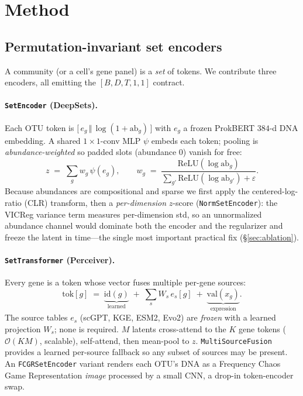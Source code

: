 \documentclass[10pt,twocolumn]{article}
\begin{document}
\section{Method}
\label{sec:method}

\subsection{Permutation-invariant set encoders}
A community (or a cell's gene panel) is a \emph{set} of tokens. We contribute three encoders, all
emitting the $[B,D,T,1,1]$ contract.

\paragraph{\texttt{SetEncoder} (DeepSets).}
Each OTU token is $\big[\,e_g \,\Vert\, \log(1\!+\!\text{ab}_g)\,\big]$ with $e_g$ a frozen ProkBERT
$384$-d DNA embedding. A shared $1\!\times\!1$-conv MLP $\psi$ embeds each token; pooling is
\emph{abundance-weighted} so padded slots (abundance $0$) vanish for free:
\begin{equation}
z \;=\; \sum_{g} w_g\,\psi(e_g),\qquad
w_g \;=\; \frac{\mathrm{ReLU}(\log\text{ab}_g)}{\sum_{g'}\mathrm{ReLU}(\log\text{ab}_{g'})+\varepsilon}.
\label{eq:setenc}
\end{equation}
Because abundances are compositional and sparse we first apply the centered-log-ratio (CLR) transform,
then a \emph{per-dimension} $z$-score (\texttt{NormSetEncoder}): the VICReg variance term measures
per-dimension std, so an unnormalized abundance channel would dominate both the encoder and the
regularizer and freeze the latent in time---the single most important practical fix (\S\ref{sec:ablation}).

\paragraph{\texttt{SetTransformer} (Perceiver).}
Every gene is a token whose vector fuses multiple per-gene sources:
\begin{equation}
\mathrm{tok}[g] \;=\; \underbrace{\mathrm{id}(g)}_{\text{learned}} \;+\; \sum_{s} W_s\, e_s[g]
\;+\; \underbrace{\mathrm{val}(x_g)}_{\text{expression}} .
\label{eq:settok}
\end{equation}
The source tables $e_s$ (scGPT, KGE, ESM2, Evo2) are \emph{frozen} with a learned projection $W_s$; none
is required. $M$ latents cross-attend to the $K$ gene tokens ($\mathcal{O}(KM)$, scalable), self-attend,
then mean-pool to $z$. \texttt{MultiSourceFusion} provides a learned per-source fallback so any subset of
sources may be present. An \texttt{FCGRSetEncoder} variant renders each OTU's DNA as a Frequency Chaos
Game Representation \emph{image} processed by a small CNN, a drop-in token-encoder swap.
\end{document}
